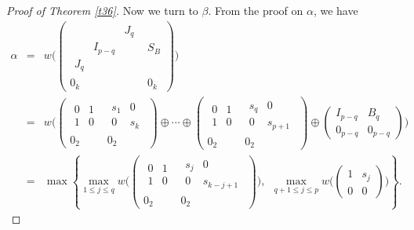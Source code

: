 \documentclass[11pt]{article}
\numberwithin{equation}{section}
\begin{document}
\begin{proof}[Proof of Theorem \ref{t36}]
Now we turn to $\beta$.
From the proof on $\alpha$, we have
\begin{eqnarray*}
\alpha & = & w\Big(\left(\begin{array}{c|c}\begin{array}{ccc}  & & J_q\\ & I_{p-q} & \\ J_q & & \end{array} & S_B
\\ \hline 0_k & 0_k\end{array}\right)\Big) \\
&= &  w\Big(\left(\begin{array}{c|c}\begin{array}{cc} 0 & 1\\ 1 & 0\end{array} & \begin{array}{cc} s_1 & 0\\ 0 & s_k\end{array}
\\ \hline 0_2 & 0_2\end{array}\right)\oplus \cdots\oplus
\left(\begin{array}{c|c}\begin{array}{cc} 0 & 1\\ 1 & 0\end{array} & \begin{array}{cc} s_q & 0\\ 0 & s_{p+1}\end{array}
\\ \hline 0_2 & 0_2\end{array}\right) \oplus
\begin{pmatrix} I_{p-q} & B_q\\ 0_{p-q} & 0_{p-q}\end{pmatrix}\Big)\\
&=& \max\left\{\max_{1\le j\le q}w\Big(\left(\begin{array}{c|c}\begin{array}{cc} 0 & 1\\ 1 & 0\end{array} & \begin{array}{cc} s_j & 0\\ 0 & s_{k-j+1}\end{array}
\\ \hline 0_2 & 0_2\end{array}\right)\Big), \ \ \max_{q+1\le j\le p} w\Big(\begin{pmatrix} 1 & s_{j}\\ 0 & 0\end{pmatrix}\Big)\right\}.

\end{eqnarray*}
\end{proof}
\end{document}
